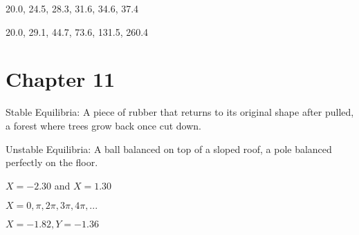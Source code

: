 \documentclass[]{memoir}
\begin{document}
20.0, 24.5, 28.3, 31.6, 34.6, 37.4


20.0, 29.1, 44.7, 73.6, 131.5, 260.4

\section{Chapter 11}


Stable Equilibria: A piece of rubber that returns to its original shape
after pulled, a forest where trees grow back once cut down.

Unstable Equilibria: A ball balanced on top of a sloped roof, a pole
balanced perfectly on the floor.


$X=-2.30$ and $X=1.30$


$X=0,\pi,2\pi,3\pi,4\pi,...$


$X=-1.82, Y=-1.36$

\end{document}
